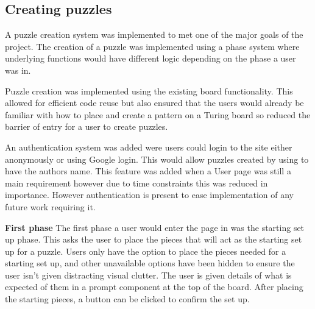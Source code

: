 \documentclass{l4proj}
\begin{document}


\subsection{Creating puzzles}
A puzzle creation system was implemented to met one of the major goals of the project. The creation of a puzzle was implemented using a phase system where underlying functions would have different logic depending on the phase a user was in. 

Puzzle creation was implemented using the existing board functionality. This allowed for efficient code reuse but also ensured that the users would already be familiar with how to place and create a pattern on a Turing board so reduced the barrier of entry for a user to create puzzles.

An authentication system was added were users could login to the site either anonymously or using Google login. This would allow puzzles created by using to have the authors name. This feature was added when a User page was still a main requirement however due to time constraints this was reduced in importance. However authentication is present to ease implementation of any future work requiring it.

\textbf{First phase}
The first phase a user would enter the page in was the starting set up phase. This asks the user to place the pieces that will act as the starting set up for a puzzle. Users only have the option to place the pieces needed for a starting set up, and other unavailable options have been hidden to ensure the user isn't given distracting visual clutter. The user is given details of what is expected of them in a prompt component at the top of the board. After placing the starting pieces, a button can be clicked to confirm the set up. 
\end{document}
